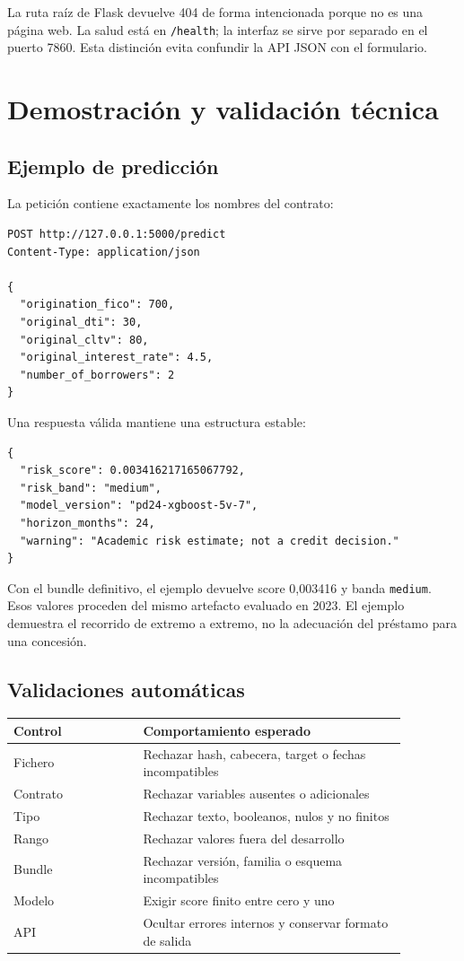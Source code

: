 \documentclass[10pt,a4paper]{article}
\newcommand{\ExampleScore}{0,003416}
\newcommand{\ExampleBand}{\texttt{medium}}
\begin{document}
La ruta raíz de Flask devuelve 404 de forma intencionada porque no es una página
web. La salud está en \texttt{/health}; la interfaz se sirve por separado en el
puerto 7860. Esta distinción evita confundir la API JSON con el formulario.

\clearpage
\section{Demostración y validación técnica}

\subsection{Ejemplo de predicción}

La petición contiene exactamente los nombres del contrato:

{\scriptsize
\begin{verbatim}
POST http://127.0.0.1:5000/predict
Content-Type: application/json

{
  "origination_fico": 700,
  "original_dti": 30,
  "original_cltv": 80,
  "original_interest_rate": 4.5,
  "number_of_borrowers": 2
}
\end{verbatim}}

Una respuesta válida mantiene una estructura estable:

{\scriptsize
\begin{verbatim}
{
  "risk_score": 0.003416217165067792,
  "risk_band": "medium",
  "model_version": "pd24-xgboost-5v-7",
  "horizon_months": 24,
  "warning": "Academic risk estimate; not a credit decision."
}
\end{verbatim}}

Con el bundle definitivo, el ejemplo devuelve score \ExampleScore{} y banda
\ExampleBand{}. Esos
valores proceden del mismo artefacto evaluado en 2023. El ejemplo
demuestra el recorrido de extremo a extremo, no la adecuación del préstamo para
una concesión.

\subsection{Validaciones automáticas}

\begin{center}\small
\begin{tabular}{p{0.29\linewidth} p{0.58\linewidth}}
\textbf{Control} & \textbf{Comportamiento esperado}\\ \hline
Fichero & Rechazar hash, cabecera, target o fechas incompatibles\\
Contrato & Rechazar variables ausentes o adicionales\\
Tipo & Rechazar texto, booleanos, nulos y no finitos\\
Rango & Rechazar valores fuera del desarrollo\\
Bundle & Rechazar versión, familia o esquema incompatibles\\
Modelo & Exigir score finito entre cero y uno\\
API & Ocultar errores internos y conservar formato de salida\\
\end{tabular}
\end{center}
\end{document}
